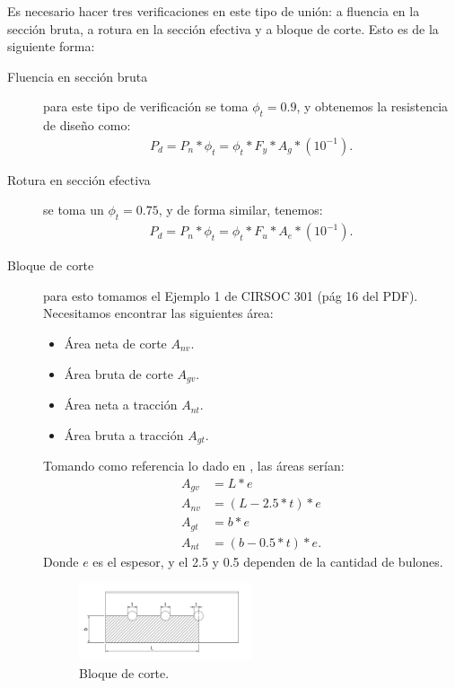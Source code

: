 \documentclass[../main.tex]{subfiles}
\begin{document}
Es necesario hacer tres verificaciones en este tipo de unión: a fluencia en la
sección bruta, a rotura en la sección efectiva y a bloque de corte. Esto es 
de la siguiente forma:

\begin{description}
  \item[Fluencia en sección bruta] para este tipo de verificación se toma 
    $\phi_t=0.9$, y obtenemos la resistencia de diseño como:
    \begin{align*}
      P_d = P_n * \phi_t = \phi_t * F_y * A_g * (10^{-1})
    .\end{align*}

  \item[Rotura en sección efectiva] se toma un $\phi_t = 0.75$, y de forma 
    similar, tenemos:
    \begin{align*}
      P_d = P_n * \phi_t = \phi_t * F_u * A_e * (10^{-1})
    .\end{align*}

  \item[Bloque de corte] para esto tomamos el Ejemplo 1 de CIRSOC 301 (pág 16 del
    PDF). Necesitamos encontrar las siguientes área:
    \begin{itemize}
      \item Área neta de corte $A_{nv}$.
      \item Área bruta de corte $A_{gv}$.
      \item Área neta a tracción $A_{nt}$.
      \item Área bruta a tracción $A_{gt}$.
    \end{itemize}
    Tomando como referencia lo dado en , las áreas serían:
    \begin{align*}
      A_{gv} &= L*e \\
      A_{nv} &= (L-2.5*t)*e \\
      A_{gt} &= b * e \\
      A_{nt} &= (b - 0.5*t)*e
    .\end{align*}
    Donde $e$ es el espesor, y el 2.5 y 0.5 dependen de la cantidad de bulones. 
    \begin{figure}[ht]
      \centering
      \includegraphics[width=0.5\textwidth]{../images/resumen/bloque}
      \caption{Bloque de corte.}
      \label{fig:bloque}
    \end{figure}


\end{description}
\end{document}
